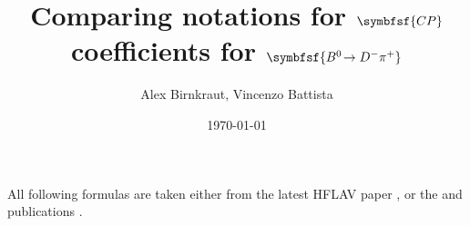 \documentclass[a4paper, 12pt]{scrartcl}
\title{Comparing notations for $\symbfsf{C{}P}$ coefficients for $\symbfsf{\BdToDpi}$}
\date{\today}
\author{Alex Birnkraut, Vincenzo Battista}
\numberwithin{equation}{section}
\begin{document}
\maketitle

All following formulas are taken either from the latest HFLAV paper \cite{Amhis:2016xyh}, or
the \belle and \babar publications \cite{Ronga:2006hv, Aubert:2006tw}.

\newpage

\newpage


\printbibliography
\end{document}
